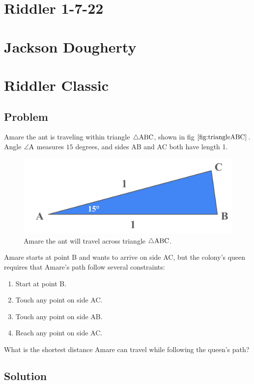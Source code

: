 \documentclass[reqno]{amsart}
\begin{document}
\section*{Riddler 1-7-22}
\section*{Jackson Dougherty}

\section*{Riddler Classic}

\subsection*{Problem}

Amare the ant is traveling within triangle $\triangle\rm ABC$, shown in fig $\ref{fig:triangleABC}$. Angle $\angle\rm A$ measures $15$ degrees, and sides AB and AC both have length 1. 

\begin{figure}[h]
	\centering
	\includegraphics[scale = 0.75]{TriangleABC.png}
	\caption{Amare the ant will travel across triangle $\triangle\rm ABC$.}
	\label{fig:triangleABC}
\end{figure}

Amare starts at point B and wants to arrive on side AC, but the colony's queen requires that Amare's path follow several constraints:
\begin{enumerate}
	\item Start at point B. 
	\item Touch any point on side AC.
	\item Touch any point on side AB.
	\item Reach any point on side AC.
\end{enumerate}

What is the shortest distance Amare can travel while following the queen's path?

\subsection*{Solution}
\end{document}
